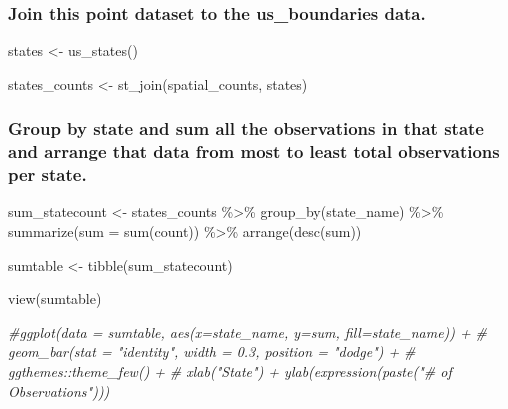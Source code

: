 \documentclass[
]{book}
\newenvironment{Shaded}{\begin{snugshade}}{\end{snugshade}}
\newcommand{\AttributeTok}[1]{\textcolor[rgb]{0.77,0.63,0.00}{#1}}
\newcommand{\CommentTok}[1]{\textcolor[rgb]{0.56,0.35,0.01}{\textit{#1}}}
\newcommand{\FunctionTok}[1]{\textcolor[rgb]{0.00,0.00,0.00}{#1}}
\newcommand{\NormalTok}[1]{#1}
\newcommand{\OtherTok}[1]{\textcolor[rgb]{0.56,0.35,0.01}{#1}}
\newcommand{\SpecialCharTok}[1]{\textcolor[rgb]{0.00,0.00,0.00}{#1}}
\begin{document}
\hypertarget{join-this-point-dataset-to-the-us_boundaries-data.}{%
\subsubsection{Join this point dataset to the us\_boundaries data.}\label{join-this-point-dataset-to-the-us_boundaries-data.}}

\begin{Shaded}
\begin{Highlighting}[]
\NormalTok{states }\OtherTok{\textless{}{-}} \FunctionTok{us\_states}\NormalTok{()}

\NormalTok{states\_counts }\OtherTok{\textless{}{-}} \FunctionTok{st\_join}\NormalTok{(spatial\_counts, states)}
\end{Highlighting}
\end{Shaded}

\hypertarget{group-by-state-and-sum-all-the-observations-in-that-state-and-arrange-that-data-from-most-to-least-total-observations-per-state.}{%
\subsubsection{Group by state and sum all the observations in that state and arrange that data from most to least total observations per state.}\label{group-by-state-and-sum-all-the-observations-in-that-state-and-arrange-that-data-from-most-to-least-total-observations-per-state.}}

\begin{Shaded}
\begin{Highlighting}[]
\NormalTok{sum\_statecount }\OtherTok{\textless{}{-}}\NormalTok{ states\_counts }\SpecialCharTok{\%\textgreater{}\%}
  \FunctionTok{group\_by}\NormalTok{(state\_name) }\SpecialCharTok{\%\textgreater{}\%}
  \FunctionTok{summarize}\NormalTok{(}\AttributeTok{sum =} \FunctionTok{sum}\NormalTok{(count)) }\SpecialCharTok{\%\textgreater{}\%}
  \FunctionTok{arrange}\NormalTok{(}\FunctionTok{desc}\NormalTok{(sum)) }

\NormalTok{sumtable }\OtherTok{\textless{}{-}} \FunctionTok{tibble}\NormalTok{(sum\_statecount)}

\FunctionTok{view}\NormalTok{(sumtable)}

\CommentTok{\#ggplot(data = sumtable, aes(x=state\_name, y=sum, fill=state\_name)) + }
\CommentTok{\#  geom\_bar(stat = "identity", width = 0.3, position = "dodge") + }
\CommentTok{\#  ggthemes::theme\_few() +}
\CommentTok{\#  xlab("State") + ylab(expression(paste("\# of Observations"))) }
\end{Highlighting}
\end{Shaded}
\end{document}
